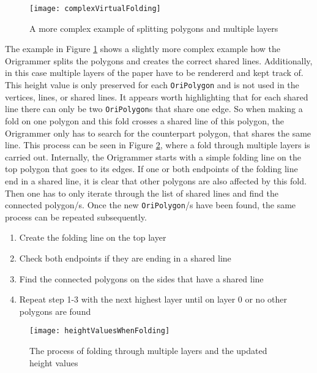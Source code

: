 \newpage

 \begin{figure}[htbp]
	\centering
	\texttt{[image: complexVirtualFolding]}
	\caption{A more complex example of splitting polygons and multiple layers}
	\label{fig:complexVirtualFolding}
\end{figure}

\noindent The example in Figure \ref{fig:complexVirtualFolding} shows a slightly more complex example how the Origrammer splits the polygons and creates the correct shared lines. Additionally, in this case multiple layers of the paper have to be rendererd and kept track of. This height value is only preserved for each \texttt{OriPolygon} and is not used in the vertices, lines, or shared lines. It appears worth highlighting that for each shared line there can only be two \texttt{OriPolygon}s that share one edge. So when making a fold on one polygon and this fold crosses a shared line of this polygon, the Origrammer only has to search for the counterpart polygon, that shares the same line. This process can be seen in Figure \ref{fig:heightValuesWhenFolding}, where a fold through multiple layers is carried out. Internally, the Origrammer starts with a simple folding line on the top polygon that goes to its edges. If one or both endpoints of the folding line end in a shared line, it is clear that other polygons are also affected by this fold. Then one has to only iterate through the list of shared lines and find the connected polygon/s. Once the new \texttt{OriPolygon}/s have been found, the same process can be repeated subsequently.


\begin{enumerate}
\item Create the folding line on the top layer
\item Check both endpoints if they are ending in a shared line
\item Find the connected polygons on the sides that have a shared line
\item Repeat step 1-3 with the next highest layer until on layer 0 or no other polygons are found
\end{enumerate}

\begin{figure}[htbp]
	\centering
	\texttt{[image: heightValuesWhenFolding]}
	\caption{The process of folding through multiple layers and the updated height values}
	\label{fig:heightValuesWhenFolding}
\end{figure}

